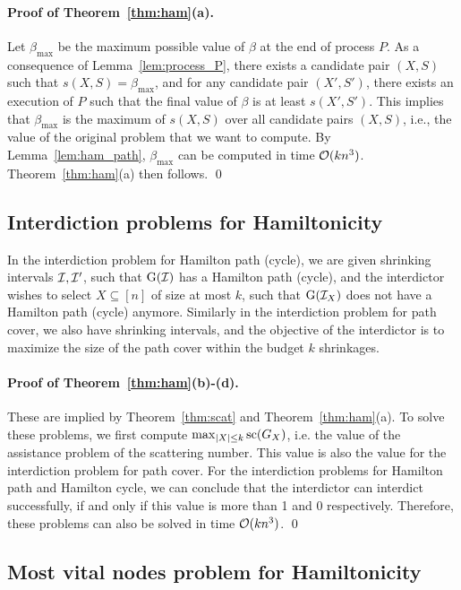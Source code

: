 \paragraph*{Proof of Theorem~\ref{thm:ham}(a).}
Let $\beta_{\max}$ be the maximum possible value of $\beta$ at the end of process $P$.
As a consequence of Lemma~\ref{lem:process_P}, there exists a candidate pair $(X,S)$ such that $s(X,S) = \beta_{\max}$, and
for any candidate pair $(X',S')$, there exists an execution of $P$ such that the final value of $\beta$ is at least $s(X',S')$.
This implies that $\beta_{\max}$ is the maximum of $s(X,S)$ over all candidate pairs $(X,S)$, i.e., the value of the original problem that we want to compute.
By Lemma~\ref{lem:ham_path}, $\beta_{\max}$ can be computed in time $\mathcal{O}(kn^3)$.
Theorem~\ref{thm:ham}(a) then follows.
\qed

\subsection{Interdiction problems for Hamiltonicity}
\label{subsection:ham_interdict}

In the interdiction problem for Hamilton path (cycle), we are given shrinking intervals $\mathcal{I}, \mathcal{I}'$, such that $\operatorname{G}(\mathcal{I})$ has a Hamilton path (cycle), and the interdictor wishes to select $X \subseteq [n]$ of size at most $k$, such that $\operatorname{G}(\mathcal{I}_X)$ does not have a Hamilton path (cycle) anymore.
Similarly in the interdiction problem for path cover, we also have shrinking intervals, and the objective of the interdictor is to maximize the size of the path cover within the budget $k$ shrinkages.

\paragraph*{Proof of Theorem~\ref{thm:ham}(b)-(d).}
These are implied by Theorem~\ref{thm:scat} and Theorem~\ref{thm:ham}(a).
To solve these problems, we first compute $\max_{|X| \leq k}\text{sc}(G_X)$, i.e. the value of the assistance problem of the scattering number.
This value is also the value for the interdiction problem for path cover.
For the interdiction problems for Hamilton path and Hamilton cycle, we can conclude that the interdictor can interdict successfully, if and only if this value is more than 1 and 0 respectively.
Therefore, these problems can also be solved in time $\mathcal{O}(kn^3)$.
\qed

\subsection{Most vital nodes problem for Hamiltonicity}
\label{subsection:ham_mvn}


